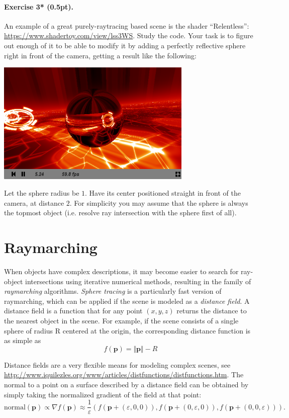 \documentclass{article}
\newenvironment{exercise}[2]{\paragraph{Exercise #1 (#2pt).} }{
\medskip}
\newcommand{\bp}{\mathbf{p}}
\begin{document}
\begin{exercise}{3*}{0.5}
An example of a great purely-raytracing based scene is the shader ``Relentless'': \url{https://www.shadertoy.com/view/lss3WS}. Study the code. Your task is to figure out enough of it to be able to modify it by adding a perfectly reflective sphere right in front of the camera, getting a result like the following:
\begin{center}
\includegraphics[width=0.7\textwidth]{relentless.png}
\end{center}
Let the sphere radius be $1$. Have its center positioned straight in front of the camera, at distance $2$. For simplicity you may assume that the sphere is always the topmost object (i.e. resolve ray intersection with the sphere first of all).
\end{exercise}

\section{Raymarching}
When objects have complex descriptions, it may become easier to search for ray-object intersections using iterative numerical methods, resulting in the family of \emph{raymarching} algorithms. \emph{Sphere tracing} is a particularly fast version of raymarching, which can be applied if the scene is modeled as a \emph{distance field}. A distance field is a function that for any point $(x, y, z)$ returns the distance to the nearest object in the scene. For example, if the scene consists of a single sphere of radius R centered at the origin, the corresponding distance function is as simple as
$$
f(\bp) = \Vert \bp \Vert - R
$$

Distance fields are a very flexible means for modeling complex scenes, see \url{http://www.iquilezles.org/www/articles/distfunctions/distfunctions.htm}.
The normal to a point on a surface described by a distance field can be obtained by simply taking the normalized gradient of the field at that point:
$$
\text{normal}(\bp) \propto \nabla f(\bp) \approx \frac{1}{\varepsilon}\left(f(\bp+(\varepsilon, 0, 0)), f(\bp+(0, \varepsilon, 0)), f(\bp+(0, 0, \varepsilon))\right).
$$
\end{document}
